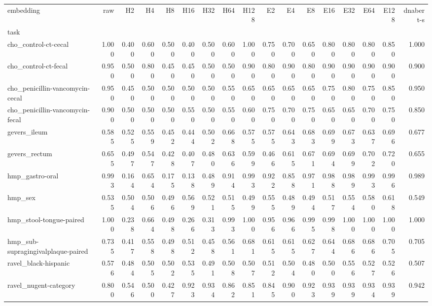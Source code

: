 \begin{tabular}{lrrrrrrrrrrrrrrrr}
\toprule
embedding & raw & H2 & H4 & H8 & H16 & H32 & H64 & H128 & E2 & E4 & E8 & E16 & E32 & E64 & E128 & dnabert-s \\
task &  &  &  &  &  &  &  &  &  &  &  &  &  &  &  &  \\
\midrule
cho_control-ct-cecal & 1.000 & 0.400 & 0.600 & 0.500 & 0.400 & 0.500 & 0.600 & 1.000 & 0.750 & 0.700 & 0.650 & 0.800 & 0.800 & 0.800 & 0.850 & 1.000 \\
cho_control-ct-fecal & 0.950 & 0.500 & 0.800 & 0.450 & 0.450 & 0.500 & 0.500 & 0.900 & 0.800 & 0.900 & 0.800 & 0.900 & 0.900 & 0.900 & 0.900 & 0.900 \\
cho_penicillin-vancomycin-cecal & 0.950 & 0.450 & 0.500 & 0.500 & 0.500 & 0.500 & 0.550 & 0.650 & 0.650 & 0.650 & 0.650 & 0.750 & 0.800 & 0.750 & 0.850 & 0.950 \\
cho_penicillin-vancomycin-fecal & 0.900 & 0.500 & 0.500 & 0.500 & 0.550 & 0.500 & 0.550 & 0.600 & 0.750 & 0.700 & 0.750 & 0.650 & 0.650 & 0.700 & 0.750 & 0.850 \\
gevers_ileum & 0.585 & 0.525 & 0.559 & 0.452 & 0.444 & 0.502 & 0.668 & 0.575 & 0.575 & 0.643 & 0.683 & 0.699 & 0.673 & 0.637 & 0.696 & 0.677 \\
gevers_rectum & 0.655 & 0.497 & 0.547 & 0.428 & 0.407 & 0.480 & 0.636 & 0.599 & 0.466 & 0.615 & 0.671 & 0.694 & 0.699 & 0.702 & 0.720 & 0.655 \\
hmp_gastro-oral & 0.993 & 0.164 & 0.654 & 0.175 & 0.138 & 0.489 & 0.914 & 0.993 & 0.922 & 0.858 & 0.971 & 0.988 & 0.989 & 0.993 & 0.996 & 0.989 \\
hmp_sex & 0.535 & 0.504 & 0.506 & 0.496 & 0.569 & 0.521 & 0.515 & 0.499 & 0.555 & 0.489 & 0.494 & 0.517 & 0.554 & 0.580 & 0.618 & 0.549 \\
hmp_stool-tongue-paired & 1.000 & 0.238 & 0.664 & 0.498 & 0.266 & 0.313 & 0.993 & 1.000 & 0.956 & 0.966 & 0.995 & 0.998 & 1.000 & 1.000 & 1.000 & 1.000 \\
hmp_sub-supragingivalplaque-paired & 0.735 & 0.417 & 0.558 & 0.498 & 0.512 & 0.458 & 0.561 & 0.681 & 0.615 & 0.615 & 0.627 & 0.644 & 0.686 & 0.686 & 0.705 & 0.705 \\
ravel_black-hispanic & 0.576 & 0.484 & 0.505 & 0.502 & 0.535 & 0.491 & 0.508 & 0.507 & 0.512 & 0.504 & 0.480 & 0.500 & 0.556 & 0.527 & 0.526 & 0.507 \\
ravel_nugent-category & 0.800 & 0.546 & 0.500 & 0.427 & 0.923 & 0.934 & 0.862 & 0.851 & 0.845 & 0.900 & 0.923 & 0.939 & 0.939 & 0.934 & 0.939 & 0.942 \\

\end{tabular}
